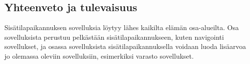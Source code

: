 \subsection{Yhteenveto ja tulevaisuus}

Sisätilapaikannuksen sovelluksia löytyy lähes kaikilta elämän osa-alueilta. Osa sovelluksista perustuu pelkästään sisätilapaikannukseen, kuten navigointi sovellukset, ja osassa sovelluksista sisätilapaikannuksella voidaan luoda lisäarvoa jo olemassa oleviin sovelluksiin, esimerkiksi varasto sovellukset.




